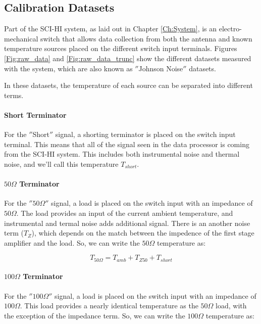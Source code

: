 \subsection{Calibration Datasets}

Part of the SCI-HI system, as laid out in Chapter \ref{Ch:System}, is an electro-mechanical switch that allows data collection from both the antenna and known temperature sources placed on the different switch input terminals. Figures \ref{Fig:raw_data} and \ref{Fig:raw_data_trunc} show the different datasets measured with the system, which are also known as $''$Johnson Noise$''$ datasets. 

In these datasets, the temperature of each source can be separated into different terms. 

\paragraph{Short Terminator}
For the $''$Short$''$ signal, a shorting terminator is placed on the switch input terminal. This means that all of the signal seen in the data processor is coming from the SCI-HI system. This includes both instrumental noise and thermal noise, and we'll call this temperature $T_{short}$.

\paragraph{$50 \Omega$ Terminator}
For the $'' 50 \Omega ''$ signal, a load is placed on the switch input with an impedance of $50 \Omega$. The load provides an input of the current ambient temperature, and instrumental and termal noise adds additional signal. There is an another noise term ($T_Z$), which depends on the match between the impedence of the first stage amplifier and the load. So, we can write the $50 \Omega$ temperature as:

\begin{equation}
T_{50 \Omega} = T_{amb}+T_{Z50}+T_{short}
\end{equation}

\paragraph{$100 \Omega$ Terminator}
For the $'' 100 \Omega ''$ signal, a load is placed on the switch input with an impedance of $100 \Omega$. This load provides a nearly identical temperature as the $50 \Omega$ load, with the exception of the impedance term. So, we can write the $100 \Omega$ temperature as:

